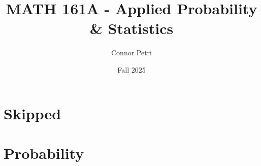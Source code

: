 \documentclass[12pt, letterpaper]{article}
\title{MATH 161A - Applied Probability \& Statistics}
\author{Connor Petri}
\date{Fall 2025}
\begin{document}
\maketitle
\pagebreak
\tableofcontents
\pagebreak

\section{Skipped}
\pagebreak

\section{Probability}



\end{document}
